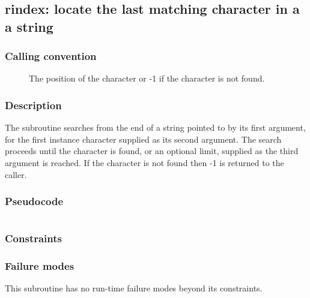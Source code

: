 \clearpage
{}
{}
\label{subr:rindex}
\subsection*{rindex: locate the last matching character in a a string}

\subsubsection*{Calling convention}

\begin{description}
\item[] The position of the character or -1 if the
  character is not found.
\end{description}

\subsubsection*{Description}

The  subroutine searches from the end of a string
pointed to by its first argument, for the first instance character
supplied as its second argument.  The search proceeds until the
character is found, or an optional limit, supplied as the third
argument is reached.  If the character is not found then -1 is
returned to the caller.

\subsubsection*{Pseudocode}

\begin{verbatim}
\end{verbatim}

\subsubsection*{Constraints}

\subsubsection*{Failure modes}

This subroutine has no run-time failure modes beyond its constraints.
